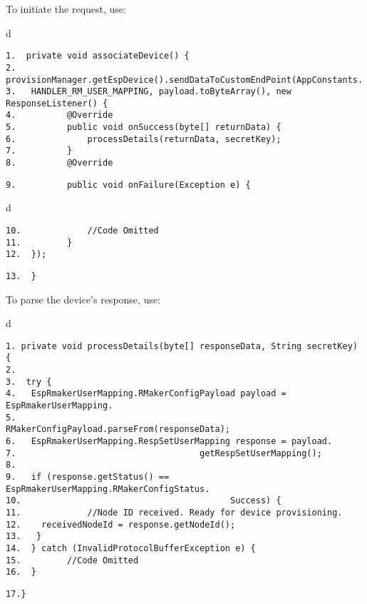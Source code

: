 \documentclass[a4paper,12pt]{book}
\begin{document}
To initiate the request, use:

\begin{codebloc}
\begin{tabular}{d}
\vspace{2pt}
\begin{verbatim}
1.  private void associateDevice() {
2.   provisionManager.getEspDevice().sendDataToCustomEndPoint(AppConstants.
3.   HANDLER_RM_USER_MAPPING, payload.toByteArray(), new ResponseListener() {
4.          @Override
5.          public void onSuccess(byte[] returnData) {
6.              processDetails(returnData, secretKey);
7.          }
8.          @Override
\end{verbatim}
\verb|9.          public void onFailure(Exception e) {|
\end{tabular}
\end{codebloc}

\begin{codebloc}
\begin{tabular}{d}
\vspace{2pt}
\begin{verbatim}
10.             //Code Omitted
11.         }
12.  });
\end{verbatim}
\verb|13.  }|
\end{tabular}
\end{codebloc}

To parse the device’s response, use:

\begin{codebloc}
\begin{tabular}{d}
\vspace{2pt}
\begin{verbatim}
1. private void processDetails(byte[] responseData, String secretKey) {
2.
3.  try {
4.   EspRmakerUserMapping.RMakerConfigPayload payload = EspRmakerUserMapping.
5.                          RMakerConfigPayload.parseFrom(responseData);
6.   EspRmakerUserMapping.RespSetUserMapping response = payload.
7.                                    getRespSetUserMapping();
8.	
9.   if (response.getStatus() == EspRmakerUserMapping.RMakerConfigStatus.
10.                                         Success) {
11.             //Node ID received. Ready for device provisioning.
12.    receivedNodeId = response.getNodeId();
13.   }
14.  } catch (InvalidProtocolBufferException e) {
15.         //Code Omitted
16.  }
\end{verbatim}
\verb|17.}|
\end{tabular}
\end{codebloc}
\end{document}
